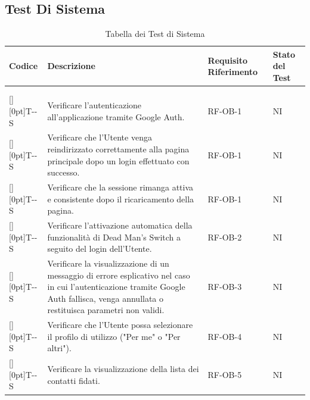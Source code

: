 \documentclass[a4paper,12pt]{article}
\newcounter{testsys}
\newcommand{\systestcode}{%
  \raisebox{0pt}[\height][0pt]{\hypertarget{T-\arabic{testsys}-S}{}}T-\arabic{testsys}-S%
}
\begin{document}
\subsection{Test Di Sistema}
\renewcommand{\arraystretch}{1.2}
\begin{longtable}{| >{\centering\arraybackslash}p{} | >{\raggedright\arraybackslash}p{} | >{\centering\arraybackslash}p{} | >{\centering\arraybackslash}p{} |}
\hline
\rowcolor{gray!60}
\textbf{Codice} & \textbf{Descrizione} & \textbf{Requisito Riferimento} & \textbf{Stato del Test} \\
\hline
\endhead
\hline
\rowcolor{white}
\caption[]{Tabella dei Test di Sistema} \\
\endfoot
\hline
\caption{Tabella dei Test di Sistema} \\
\endlastfoot

\stepcounter{testsys} \systestcode & Verificare l'autenticazione all'applicazione tramite Google Auth. & RF-OB-1 & NI \\
\hline

\stepcounter{testsys} \systestcode & Verificare che l'Utente venga reindirizzato correttamente alla pagina principale dopo un login effettuato con successo. & RF-OB-1 & NI \\
\hline

\stepcounter{testsys} \systestcode & Verificare che la sessione rimanga attiva e consistente dopo il ricaricamento della pagina. & RF-OB-1 & NI \\
\hline

\stepcounter{testsys} \systestcode & Verificare l'attivazione automatica della funzionalità di Dead Man's Switch a seguito del login dell'Utente. & RF-OB-2 & NI \\
\hline

\stepcounter{testsys} \systestcode & Verificare la visualizzazione di un messaggio di errore esplicativo nel caso in cui l'autenticazione tramite Google Auth fallisca, venga annullata o restituisca parametri non validi. & RF-OB-3 & NI \\
\hline

\stepcounter{testsys} \systestcode & Verificare che l'Utente possa selezionare il profilo di utilizzo ("Per me" o "Per altri"). & RF-OB-4 & NI \\
\hline

\stepcounter{testsys} \systestcode & Verificare la visualizzazione della lista dei contatti fidati. & RF-OB-5 & NI \\
\hline


\end{longtable}
\end{document}
